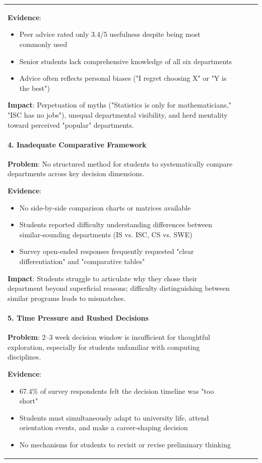 \documentclass[12pt, a4paper]{article}
\begin{document}
\begin{itemize}[leftmargin=1.5em, itemsep=3pt]
\begin{table}[H]
\begin{tabularx}{\textwidth}{>{\raggedright\arraybackslash}p{0.8cm}>{\raggedright\arraybackslash}p{3.5cm}>{\raggedright\arraybackslash}X>{\raggedright\arraybackslash}p{2.5cm}}
\textbf{Evidence}:
\begin{itemize}[leftmargin=1.5em, itemsep=2pt]
    \item Peer advice rated only 3.4/5 usefulness despite being most commonly used
    \item Senior students lack comprehensive knowledge of all six departments
    \item Advice often reflects personal biases ("I regret choosing X" or "Y is the best")
\end{itemize}

\textbf{Impact}: Perpetuation of myths ("Statistics is only for mathematicians," "ISC has no jobs"), unequal departmental visibility, and herd mentality toward perceived "popular" departments.

\paragraph{4. Inadequate Comparative Framework}

\textbf{Problem}: No structured method for students to systematically compare departments across key decision dimensions.

\textbf{Evidence}:
\begin{itemize}[leftmargin=1.5em, itemsep=2pt]
    \item No side-by-side comparison charts or matrices available
    \item Students reported difficulty understanding differences between similar-sounding departments (IS vs. ISC, CS vs. SWE)
    \item Survey open-ended responses frequently requested "clear differentiation" and "comparative tables"
\end{itemize}

\textbf{Impact}: Students struggle to articulate why they chose their department beyond superficial reasons; difficulty distinguishing between similar programs leads to mismatches.

\paragraph{5. Time Pressure and Rushed Decisions}

\textbf{Problem}: 2--3 week decision window is insufficient for thoughtful exploration, especially for students unfamiliar with computing disciplines.

\textbf{Evidence}:
\begin{itemize}[leftmargin=1.5em, itemsep=2pt]
    \item 67.4\% of survey respondents felt the decision timeline was "too short"
    \item Students must simultaneously adapt to university life, attend orientation events, and make a career-shaping decision
    \item No mechanisms for students to revisit or revise preliminary thinking
\end{itemize}


\end{tabularx}
\end{table}
\end{itemize}
\end{document}
